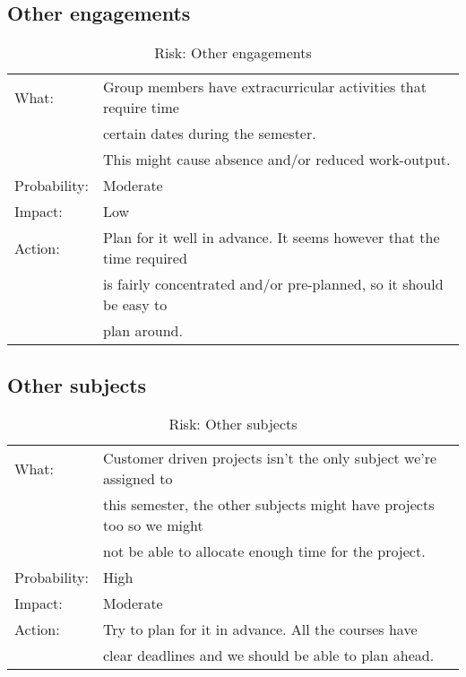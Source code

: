 \subsection{Other engagements}
\begin{table}[H]
\begin{tabular}{| l | l |}
	\hline
	What: & Group members have extracurricular activities that require time \\
	 & certain dates during the semester.\\
	 & This might cause absence and/or reduced work-output.\\
	\hline
	Probability: & Moderate \\
	\hline
	Impact: & Low \\
	\hline
	Action: & Plan for it well in advance. It seems however that the time required\\
	& is fairly concentrated and/or pre-planned, so it should be easy to\\
	& plan around.\\
	\hline
\end{tabular}
\caption{Risk: Other engagements}
\end{table}

\subsection{Other subjects}
\begin{table}[H]
\begin{tabular}{| l | l |}
	\hline
	What: & Customer driven projects isn't the only subject we're assigned to\\
	& this semester, the other subjects might have projects too so we might\\
	& not be able to allocate enough time for the project.\\
	\hline
	Probability: & High \\
	\hline
	Impact: & Moderate \\
	\hline
	Action: & Try to plan for it in advance. All the courses have\\
	 & clear deadlines and we should be able to plan ahead.\\
	\hline
\end{tabular}
\caption{Risk: Other subjects}
\end{table}

